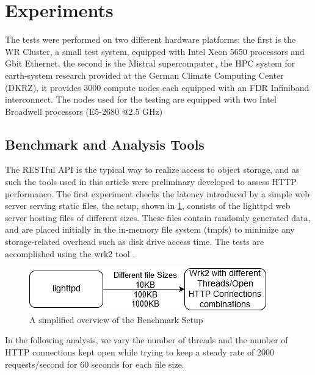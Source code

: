\documentclass[runningheads]{llncs}
\begin{document}
\section{Experiments}
\label{sec:experiments}
The tests were performed on two different hardware platforms: the first is the WR Cluster, a small test system, equipped with Intel Xeon 5650 processors and Gbit Ethernet, the second is the Mistral supercomputer\,\cite{mistral}, the HPC system for earth-system research provided at the German Climate Computing Center (DKRZ), it provides 3000 compute nodes each equipped with an FDR Infiniband interconnect. The nodes used for the testing are equipped with two Intel Broadwell processors (E5-2680 @2.5 GHz) \cite{intel-xeon}

\subsection{Benchmark and Analysis Tools}\label{subsec:benchmark1}
The RESTful API is the typical way to realize access to object storage, and as such the tools used in this article were preliminary developed to assess HTTP performance.
The first experiment checks the latency introduced by a simple web server serving static files, the setup, shown in \cref{fig:wrk2bench}, consists of the lighttpd web server \cite{lighttpd} hosting files of different sizes. These files contain randomly generated data, and are placed initially in the in-memory file system (tmpfs) to minimize any storage-related overhead such as disk drive access time. The tests are accomplished using the wrk2 tool \cite{wrk2URL}.
\vspace{-1.5em}
\begin{figure}
\centering
\includegraphics[width=.6\linewidth]{wrk2bench.png}
\caption{A simplified overview of the Benchmark Setup}
\vspace{-1.5em}
\label{fig:wrk2bench}
\end{figure}
In the following analysis, we vary the number of threads and the number of HTTP connections kept open while trying to keep a steady rate of 2000 requests/second for 60 seconds for each file size.
\end{document}
